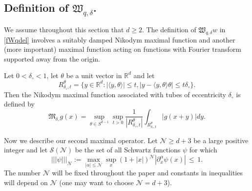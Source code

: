 \documentclass[11pt]{amsart}
\theoremstyle{definition}
\numberwithin{theorem}{section}
\numberwithin{definition}{section}
\def\trnorm{|\!|\!|}
\def\inn#1#2{\langle#1,#2\rangle}
\newcommand{\Be}{\begin{equation}}
\newcommand{\Ee}{\end{equation}}
\def\inn#1#2{\langle#1,#2\rangle}
\def\fM{{\mathfrak {M}}}
\def\fR{{\mathfrak {R}}}
\def\fV{{\mathfrak {V}}}
\def\fW{{\mathfrak {W}}}
\def\bbR{{\mathbb {R}}}
\def\cM{{\mathcal {M}}}
\def\cN{{\mathcal {N}}}
\def\cS{{\mathcal {S}}}
\begin{document}
%




\subsection*
{Definition of $\fW_{q,\delta}$.} We assume throughout this section that
 $d\ge 2$.
The definition of $\fW_{q,\delta} w$ in  \eqref{fWqdel}  involves a
suitably damped
Nikodym maximal function  and another (more important)
 maximal function acting on functions with
Fourier transform supported away from the origin.


Let $0<\delta_\circ<1$, let $\theta$ be a unit vector in $\bbR^d$  and let
$$R_{\delta_\circ,t}^\theta  =
\{y\in \bbR^d: |\inn y \theta|\le t, |y-\inn y\theta \theta |\le t\delta_\circ\}.$$
Then the Nikodym maximal function associated with tubes of
eccentricity $\delta_\circ$ is defined by
\begin{equation}\label{nikodym} \fM_{\delta_\circ} g(x)
=\sup_{\theta\in S^{d-1}}\sup_{t>0}
\frac{1}{|R_{\delta_\circ,t}^\theta|}
\int_{R_{\delta_\circ,t}^\theta} |g(x+y)| dy.
\end{equation}





Now we describe our second maximal operator.
 Let  $\cN \ge d+3$ be a large positive integer
and let
$\cS(\cN)$ be  the set of all Schwartz functions $\psi$
  for which
\Be \label{SNdef}
\trnorm \psi\trnorm_{\cN} := \max_{|\alpha|\le \cN} \sup_x (1+|x|)^{\cN} |\partial^\alpha_x \psi(x)| \,\le\,1.
\Ee
The number $\cN$ will be fixed throughout the paper and constants in
inequalities will  depend on $\cN$ (one may want to choose $\cN=d+3$).
\end{document}
